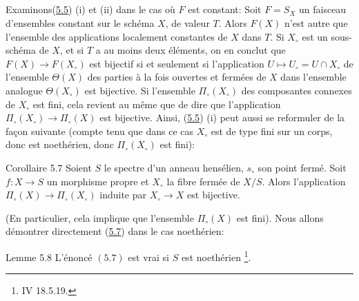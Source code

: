 \documentclass[10pt]{../fichiers-configuration-latex/smfart}
\begin{document}
\subsection{}
Examinons\pageoriginale (\hyperref[XII.cor5.5]{5.5}) (i) et (ii) dans le cas où $F$ est
constant: Soit $F=S_X$ un faisceau d'ensembles constant sur le schéma
$X$, de valeur $T$. Alors $F(X)$ n'est autre que l'ensemble des
applications localement constantes de $X$ dans $T$. Si $X_{\circ}$ est
un sous-schéma de $X$, et si $T$ a au moins deux éléments, on en
conclut que $F(X)\rightarrow F(X_{\circ})$ est bijectif si et
seulement si l'application $U\mapsto U_{\circ}=U\cap X_{\circ}$ de
l'ensemble $\Theta(X)$ des parties à la fois ouvertes et fermées de
$X$ dans l'ensemble analogue $\Theta(X_{\circ})$ est bijective. Si
l'ensemble $\Pi_{\circ}(X_{\circ})$ des composantes connexes de
$X_{\circ}$ est fini, cela revient au même que de dire que
l'application $\Pi_{\circ}(X_{\circ})\rightarrow \Pi_{\circ}(X)$ est
bijective. Ainsi, (\hyperref[XII.cor5.5]{5.5}) (i) peut aussi se reformuler de la façon
suivante (compte tenu que dans ce cas $X_{\circ}$ est de type fini sur
un corps, donc est noethérien, donc $\Pi_{\circ}(X_{\circ})$ est
fini):

\begin{enonce*}{Corollaire 5.7}
Soient $S$ le spectre d'un anneau hensélien, $s_{\circ}$ son point
fermé. Soit $f:X\rightarrow S$ un morphisme propre et $X_{\circ}$ la
fibre fermée de $X/S$. Alors l'application $\Pi_{\circ}(X)\rightarrow
\Pi_{\circ}(X_{\circ})$ induite par $X_{\circ}\rightarrow X$ est
bijective.
\end{enonce*}

(En particulier, cela implique que l'ensemble $\Pi_{\circ}(X)$ est
fini). Nous allons démontrer directement (\hyperref[XII.cor5.7]{5.7}) dans le cas noethérien:

\begin{enonce*}{Lemme 5.8}
L'énoncé $(5.7)$ est vrai si $S$ est noethérien \footnote[1]{\Cf \EGA
  IV 18.5.19.}.
\end{enonce*}
\end{document}

